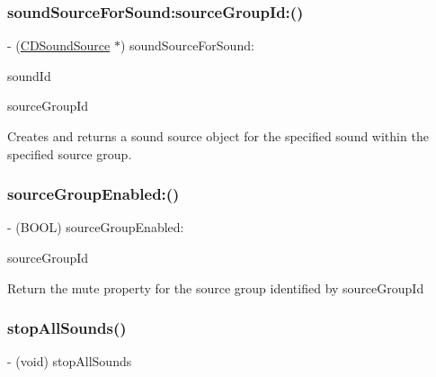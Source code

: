 \subsubsection{\texorpdfstring{sound\+Source\+For\+Sound\+:source\+Group\+Id\+:()}{soundSourceForSound:sourceGroupId:()}\hspace{0.1cm}{\footnotesize\ttfamily [4/4]}}
{\footnotesize\ttfamily -\/ (\hyperlink{interfaceCDSoundSource}{C\+D\+Sound\+Source} $\ast$) sound\+Source\+For\+Sound\+: \begin{DoxyParamCaption}\item[{(int)}]{sound\+Id }\item[{sourceGroupId:(int)}]{source\+Group\+Id }\end{DoxyParamCaption}}

Creates and returns a sound source object for the specified sound within the specified source group. \mbox{\label{interfaceCDSoundEngine_a9e73b1f9ce070579469e18da0fdabf5a}} 
\subsubsection{\texorpdfstring{source\+Group\+Enabled\+:()}{sourceGroupEnabled:()}}
{\footnotesize\ttfamily -\/ (B\+O\+OL) source\+Group\+Enabled\+: \begin{DoxyParamCaption}\item[{(int)}]{source\+Group\+Id }\end{DoxyParamCaption}}

Return the mute property for the source group identified by source\+Group\+Id \mbox{\label{interfaceCDSoundEngine_a8bbc63632a5e72c9235c39730e8efb38}} 
\subsubsection{\texorpdfstring{stop\+All\+Sounds()}{stopAllSounds()}\hspace{0.1cm}{\footnotesize\ttfamily [1/4]}}
{\footnotesize\ttfamily -\/ (void) stop\+All\+Sounds \begin{DoxyParamCaption}{ }\end{DoxyParamCaption}}

